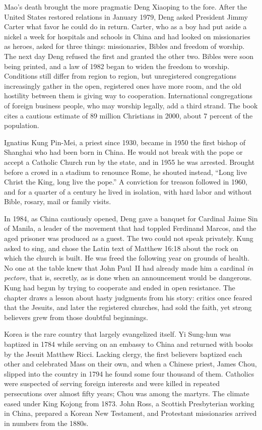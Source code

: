Mao's death brought the more pragmatic Deng Xiaoping to the fore. After the United States restored
relations in January 1979, Deng asked President Jimmy Carter what favor he could do in return.
Carter, who as a boy had put aside a nickel a week for hospitals and schools in China and had looked
on missionaries as heroes, asked for three things: missionaries, Bibles and freedom of worship. The
next day Deng refused the first and granted the other two. Bibles were soon being printed, and a law
of 1982 began to widen the freedom to worship. Conditions still differ from region to region, but
unregistered congregations increasingly gather in the open, registered ones have more room, and the
old hostility between them is giving way to cooperation. International congregations of foreign
business people, who may worship legally, add a third strand. The book cites a cautious estimate of
89 million Christians in 2000, about 7 percent of the population.

Ignatius Kung Pin-Mei, a priest since 1930, became in 1950 the first bishop of Shanghai who had been
born in China. He would not break with the pope or accept a Catholic Church run by the state, and in
1955 he was arrested. Brought before a crowd in a stadium to renounce Rome, he shouted instead,
``Long live Christ the King, long live the pope.'' A conviction for treason followed in 1960, and for
a quarter of a century he lived in isolation, with hard labor and without Bible, rosary, mail or
family visits.

In 1984, as China cautiously opened, Deng gave a banquet for Cardinal Jaime Sin of Manila, a leader
of the movement that had toppled Ferdinand Marcos, and the aged prisoner was produced as a guest. The
two could not speak privately. Kung asked to sing, and chose the Latin text of Matthew 16:18 about
the rock on which the church is built. He was freed the following year on grounds of health. No one
at the table knew that John Paul~II had already made him a cardinal \emph{in pectore}, that is,
secretly, as is done when an announcement would be dangerous. Kung had begun by trying to cooperate
and ended in open resistance. The chapter draws a lesson about hasty judgments from his story:
critics once feared that the Jesuits, and later the registered churches, had sold the faith, yet
strong believers grew from those doubtful beginnings.

Korea is the rare country that largely evangelized itself. Yi Sung-hun was baptized in 1784 while
serving on an embassy to China and returned with books by the Jesuit Matthew Ricci. Lacking clergy,
the first believers baptized each other and celebrated Mass on their own, and when a Chinese priest,
James Chou, slipped into the country in 1794 he found some four thousand of them. Catholics were
suspected of serving foreign interests and were killed in repeated persecutions over almost fifty
years; Chou was among the martyrs. The climate eased under King Kojong from 1873. John Ross, a
Scottish Presbyterian working in China, prepared a Korean New Testament, and Protestant missionaries
arrived in numbers from the 1880s.

